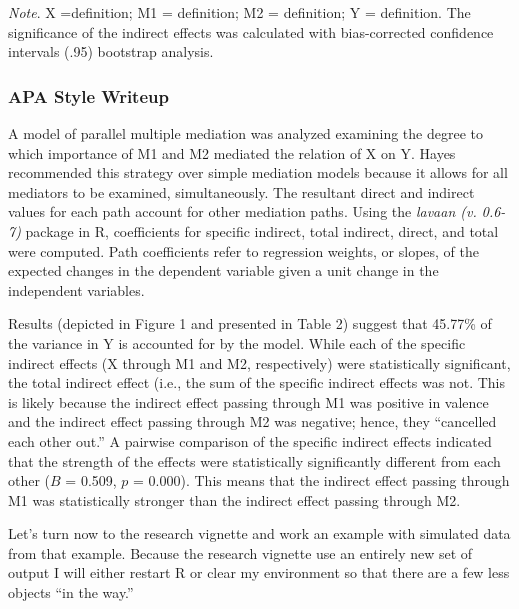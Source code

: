 \documentclass[
]{book}
\begin{document}
\begin{longtable}[]{@{}
  >{\raggedright\arraybackslash}p{}@{}}
\toprule
\endhead
\bottomrule
\end{longtable}

\emph{Note}. X =definition; M1 = definition; M2 = definition; Y = definition. The significance of the indirect effects was calculated with bias-corrected confidence intervals (.95) bootstrap analysis.

\hypertarget{apa-style-writeup}{%
\subsubsection{APA Style Writeup}\label{apa-style-writeup}}

A model of parallel multiple mediation was analyzed examining the degree to which importance of M1 and M2 mediated the relation of X on Y. Hayes \citeyearpar{hayes_introduction_2018} recommended this strategy over simple mediation models because it allows for all mediators to be examined, simultaneously. The resultant direct and indirect values for each path account for other mediation paths. Using the \emph{lavaan (v. 0.6-7)} package in R, coefficients for specific indirect, total indirect, direct, and total were computed. Path coefficients refer to regression weights, or slopes, of the expected changes in the dependent variable given a unit change in the independent variables.

Results (depicted in Figure 1 and presented in Table 2) suggest that 45.77\% of the variance in Y is accounted for by the model. While each of the specific indirect effects (X through M1 and M2, respectively) were statistically significant, the total indirect effect (i.e., the sum of the specific indirect effects was not. This is likely because the indirect effect passing through M1 was positive in valence and the indirect effect passing through M2 was negative; hence, they ``cancelled each other out.'' A pairwise comparison of the specific indirect effects indicated that the strength of the effects were statistically significantly different from each other (\(B\) = 0.509, \(p\) = 0.000). This means that the indirect effect passing through M1 was statistically stronger than the indirect effect passing through M2.

Let's turn now to the research vignette and work an example with simulated data from that example. Because the research vignette use an entirely new set of output I will either restart R or clear my environment so that there are a few less objects ``in the way.''
\end{document}
